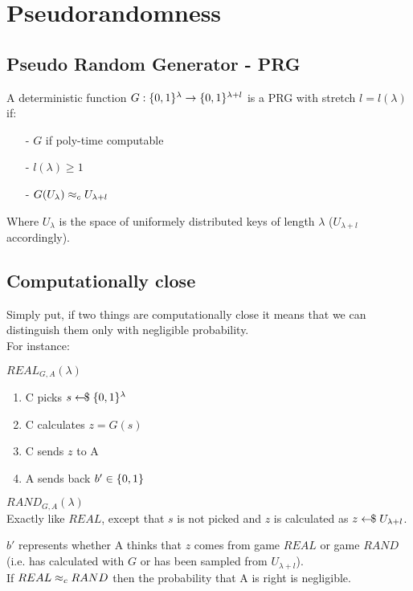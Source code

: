 \chapter{Pseudorandomness}

\section{Pseudo Random Generator - PRG}
A deterministic function $G : \{0,1\}^\lambda \rightarrow \{0,1\}^{\lambda + l}$ is a PRG with stretch $l = l(\lambda)$ if:
\begin{itemize}
    \item[-] $G$ if poly-time computable
    \item[-] $l(\lambda) \geq 1$
    \item[-] $G(U_\lambda) \approx_c U_{\lambda + l}$  
\end{itemize}

Where $U_\lambda$ is the space of uniformely distributed keys of length $\lambda$ ($U_{\lambda + l}$ accordingly).


\section{Computationally close}
Simply put, if two things are computationally close it means that we can distinguish them only with negligible probability.\\
For instance:
\begin{multicols}{2}
    $REAL_{G,A}(\lambda)$
    \begin{enumerate}
        \item C picks $s \leftarrow\kern-0.42em{\$} \; \{0,1\}^\lambda$
        \item C calculates $z = G(s)$
        \item C sends $z$ to A
        \item A sends back $b' \in \{0,1\}$
    \end{enumerate}
    
    \columnbreak

    $RAND_{G,A}(\lambda)$\\
    Exactly like $REAL$, except that $s$ is not picked and $z$ is calculated as \newline $z \leftarrow\kern-0.42em{\$} \; U_{\lambda + l}$.
\end{multicols}

$b'$ represents whether A thinks that $z$ comes from game $REAL$ or game $RAND$ (i.e. has calculated with $G$ or has been sampled from $U_{\lambda + l}$).\\
If $REAL \approx_c RAND$ then the probability that A is right is negligible.
\newpage

